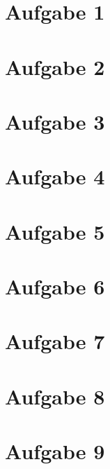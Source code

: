 \documentclass{article}
\begin{document}
  
\section*{Aufgabe 1}


\section*{Aufgabe 2}


\section*{Aufgabe 3}

  
\section*{Aufgabe 4}


\section*{Aufgabe 5}


\section*{Aufgabe 6}


\section*{Aufgabe 7}

  
\section*{Aufgabe 8}


\section*{Aufgabe 9}

\end{document}
